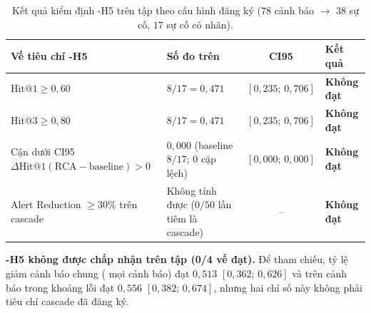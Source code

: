 \begin{table}[H]
  \centering
  \caption[Kiểm định giả thuyết H5 trên tập test theo bản đăng ký]{Kết quả kiểm định \hyp{H5} trên tập  theo cấu hình đăng ký ($78$ cảnh báo \CTAV{} $\to$ $38$ sự cố, $17$ sự cố có nhãn).}
  \label{tab:ch5-h5}
  \tblfont
  \tblsetup
  \setlength{\tabcolsep}{4pt}
  \begin{tabularx}{\linewidth}{|Y|>{\raggedright\arraybackslash}p{4.3cm}|c|l|}
    \hline
    \textbf{Vế tiêu chí \hyp{H5}} & \textbf{Số đo trên } & \textbf{CI95} & \textbf{Kết quả} \\
    \hline
    $\text{Hit@1} \ge 0{,}60$ & $8 / 17 = 0{,}471$ & $[0{,}235;\, 0{,}706]$ & \textbf{Không đạt} \\
    \hline
    $\text{Hit@3} \ge 0{,}80$ & $8 / 17 = 0{,}471$ & $[0{,}235;\, 0{,}706]$ & \textbf{Không đạt} \\
    \hline
    Cận dưới CI95 $\Delta\text{Hit@1}(\text{RCA}-\text{baseline}) > 0$ & $0{,}000$ (baseline $8/17$; $0$ cặp lệch) & $[0{,}000;\, 0{,}000]$ & \textbf{Không đạt} \\
    \hline
    Alert Reduction $\ge 30\%$ trên cascade & Không tính được ($0/50$ lần tiêm là cascade) & -- & \textbf{Không đạt} \\
    \hline
  \end{tabularx}
\end{table}

\textbf{\hyp{H5} không được chấp nhận trên tập  (0/4 vế đạt).} Để tham chiếu, tỷ lệ giảm cảnh báo chung ( mọi cảnh báo) đạt $0{,}513$ $[0{,}362;\, 0{,}626]$ và trên cảnh báo trong khoảng lỗi đạt $0{,}556$ $[0{,}382;\, 0{,}674]$, nhưng hai chỉ số này không phải tiêu chí cascade đã đăng ký.

